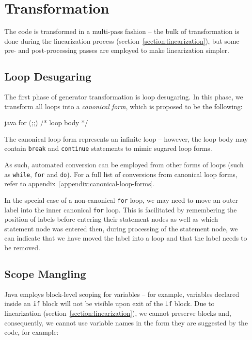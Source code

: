 \documentclass[journal,a4paper]{IEEEtran}
\begin{document}
\section{Transformation}

The code is transformed in a multi-pass fashion -- the bulk of transformation is done during the
linearization process (section~\ref{section:linearization}), but some pre- and post-processing
passes are employed to make linearization simpler.

\subsection{Loop Desugaring}

The first phase of generator transformation is loop desugaring. In this phase, we transform all
loops into a \emph{canonical form}, which is proposed to be the following:

\begin{pygmented}{java}
for (;;) { /* loop body */ }
\end{pygmented}

The canonical loop form represents an infinite loop -- however, the loop body may contain
\texttt{break} and \texttt{continue} statements to mimic sugared loop forms.

As such, automated conversion can be employed from other forms of loops (such as \texttt{while},
\texttt{for} and \texttt{do}). For a full list of conversions from canonical loop forms, refer to
appendix~\ref{appendix:canonical-loop-forms}.

In the special case of a non-canonical \texttt{for} loop, we may need to move an outer label into
the inner canonical \texttt{for} loop. This is facilitated by remembering the position of labels
before entering their statement nodes as well as which statement node was entered then, during
processing of the statement node, we can indicate that we have moved the label into a loop and that
the label needs to be removed.

\subsection{Scope Mangling}

Java employs block-level scoping for variables -- for example, variables declared inside an
\texttt{if} block will not be visible upon exit of the \texttt{if} block. Due to linearization
(section~\ref{section:linearization}), we cannot preserve blocks and, consequently, we cannot use
variable names in the form they are suggested by the code, for example:
\end{document}
